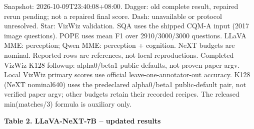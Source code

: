 \documentclass[10pt,a4paper]{article}
\begin{document}
{\footnotesize Snapshot: 2026-10-09T23:40:08+08:00. Dagger: old complete result, repaired rerun pending; not a repaired final score. Dash: unavailable or protocol unresolved. Star: VizWiz validation. SQA uses the shipped CQM-A input (2017 image questions). POPE uses mean F1 over 2910/3000/3000 questions. LLaVA MME: perception; Qwen MME: perception + cognition. NeXT budgets are nominal. Reported rows are references, not local reproductions. Completed VizWiz K128 followup: alpha0/beta1 public defaults, not proven paper argv. Local VizWiz primary scores use official leave-one-annotator-out accuracy. K128 (NeXT nominal640) uses the predeclared alpha0/beta1 public-default pair, not verified paper argv; other budgets retain their recorded recipes. The released min(matches/3) formula is auxiliary only.\par}
\newpage
{\large\textbf{Table 2. LLaVA-NeXT-7B -- updated results}}\par\medskip
\begingroup\setlength{\tabcolsep}{3.2pt}\renewcommand{\arraystretch}{1.03}
\end{document}
